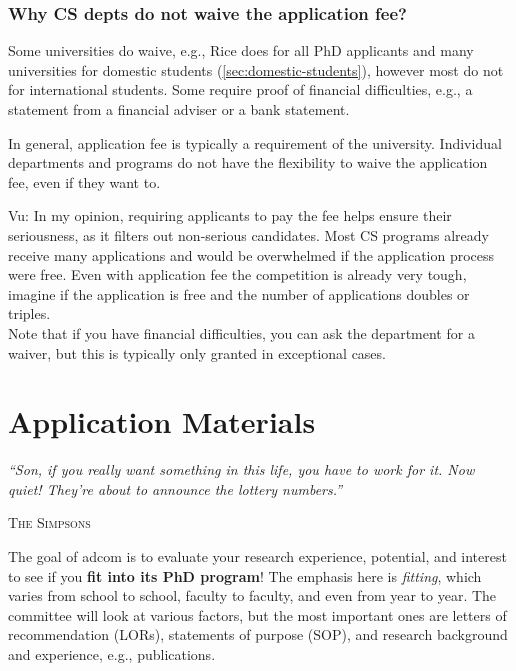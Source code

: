 \documentclass[oneside,11pt,dvipsnames]{book}
\newcommand{\myepigraphsimpsons}[1]{
\epigraph{\vspace{-0.2in} \emph{#1}}{\textsc{The Simpsons}}
}
\newenvironment{commentbox}[1][]{
  \small
  \begin{mybox}
    {\small \textbf{#1}}
  }{
  \end{mybox}
}
\begin{document}
\section{Why CS depts do not waive the application fee?}\label{sec:fee-waive}

Some universities do waive, e.g., Rice does for all PhD applicants and many universities for domestic students (\autoref{sec:domestic-students}), however most do not for international students.
Some require proof of financial difficulties, e.g., a statement from a financial adviser or a bank statement.

In general, application fee is typically a requirement of the university. Individual departments and programs do not have the flexibility to waive the application fee, even if they want to.

\begin{commentbox}{Vu:}
In my opinion, requiring applicants to pay the fee helps ensure their seriousness, as it filters out non-serious candidates. Most CS programs already receive many applications and would be overwhelmed if the application process were free.  Even with application fee the competition is already very tough, imagine if the application is free and the number of applications doubles or triples.\\

Note that if you have financial difficulties, you can ask the department for a waiver, but this is typically only granted in exceptional cases.
\end{commentbox}



\part{Application Materials}\label{part:application}


\myepigraphsimpsons{``Son, if you really want something in this life, you have to work for it. Now quiet! They're about to announce the lottery numbers.''}


The goal of adcom is to evaluate your research experience, potential, and interest to see if you \textbf{fit into its PhD program}! The emphasis here is \emph{fitting}, which varies from school to school, faculty to faculty, and even from year to year.  
The committee will look at various factors, but the most important ones are letters of recommendation (LORs),  statements of purpose (SOP), and research background and experience, e.g., publications.
\end{document}
